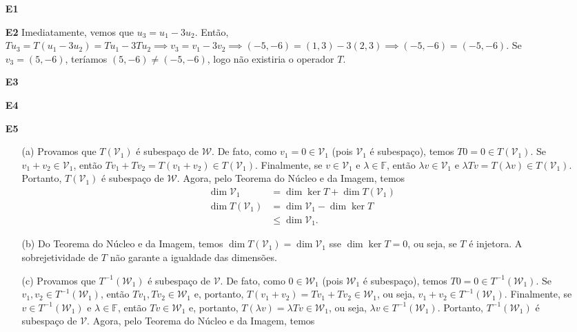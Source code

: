\documentclass[12pt]{article}
\begin{document}
\begin{enumerate}
    \item[\textbf{E1}] 
    
    \item[\textbf{E2}] Imediatamente, vemos que \(u_3 = u_1 - 3 u_2\). Então, \(Tu_3 = T(u_1 - 3 u_2) = Tu_1 - 3Tu_2 \implies v_3 = v_1 - 3v_2 \implies (-5,-6) = (1,3) - 3(2,3) \implies (-5,-6) = (-5,-6)\). Se \(v_3 = (5,-6)\), teríamos \((5,-6)\neq(-5,-6)\), logo não existiria o operador \(T\).

    \item[\textbf{E3}] 
    \item[\textbf{E4}]
    \item[\textbf{E5}] 
        \begin{enumerate}
            \item[(a)] Provamos que \(T(\mathcal{V}_1)\) é subespaço de \(\mathcal{W}\). De fato, como \(v_1=0 \in \mathcal{V}_1\) (pois \(\mathcal{V}_1\) é subespaço), temos \(T0 = 0 \in T(\mathcal{V}_1)\). Se \(v_1+v_2 \in \mathcal{V}_1\), então \(Tv_1 + Tv_2 = T(v_1+v_2) \in T(\mathcal{V}_1)\). Finalmente, se \(v \in \mathcal{V}_1\) e \(\lambda \in \mathbb{F}\), então \(\lambda v \in \mathcal{V}_1\) e \(\lambda Tv = T(\lambda v) \in T(\mathcal{V}_1)\). Portanto, \(T(\mathcal{V}_1)\) é subespaço de \(\mathcal{W}\). Agora, pelo Teorema do Núcleo e da Imagem, temos
                \begin{align}
                    \dim \mathcal{V}_1 &= \dim \ker T + \dim T(\mathcal{V}_1) \\
                    \dim T(\mathcal{V}_1) &= \dim \mathcal{V}_1 - \dim \ker T \\
                    &\leq \dim \mathcal{V}_1.
                \end{align}
            \item[(b)] Do Teorema do Núcleo e da Imagem, temos \(\dim T(\mathcal{V}_1) = \dim \mathcal{V}_1\) sse \(\dim \ker T = 0\), ou seja, se \(T\) é injetora. A sobrejetividade de \(T\) não garante a igualdade das dimensões.
            \item[(c)] Provamos que \(T^{-1}(\mathcal{W}_1)\) é subespaço de \(\mathcal{V}\). De fato, como \(0 \in \mathcal{W}_1\) (pois \(\mathcal{W}_1\) é subespaço), temos \(T0 = 0 \in T^{-1}(\mathcal{W}_1)\). Se \(v_1, v_2 \in T^{-1}(\mathcal{W}_1)\), então \(Tv_1, Tv_2 \in \mathcal{W}_1\) e, portanto, \(T(v_1+v_2) = Tv_1 + Tv_2 \in \mathcal{W}_1\), ou seja, \(v_1 + v_2 \in T^{-1}(\mathcal{W}_1)\). Finalmente, se \(v \in T^{-1}(\mathcal{W}_1)\) e \(\lambda \in \mathbb{F}\), então \(Tv \in \mathcal{W}_1\) e, portanto, \(T(\lambda v) = \lambda Tv \in \mathcal{W}_1\), ou seja, \(\lambda v \in T^{-1}(\mathcal{W}_1)\). Portanto, \(T^{-1}(\mathcal{W}_1)\) é subespaço de \(\mathcal{V}\). Agora, pelo Teorema do Núcleo e da Imagem, temos
                

\end{enumerate}
\end{enumerate}
\end{document}
